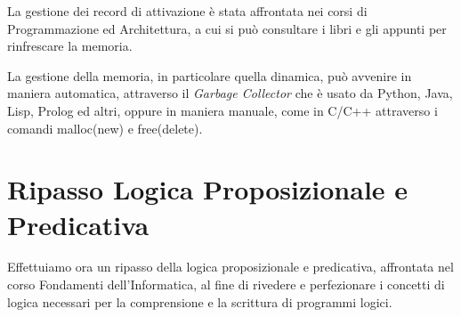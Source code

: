 \documentclass[a4paper]{report}
\begin{document}
La gestione dei record di attivazione è stata affrontata nei corsi di Programmazione ed Architettura, a cui si può consultare i
libri e gli appunti per rinfrescare la memoria.

La gestione della memoria, in particolare quella dinamica, può avvenire in maniera automatica, attraverso il \emph{Garbage Collector} che è
usato da Python, Java, Lisp, Prolog ed altri, oppure in maniera manuale, come in C/C++ attraverso i comandi malloc(new) e free(delete).

\chapter{Ripasso Logica Proposizionale e Predicativa}
Effettuiamo ora un ripasso della logica proposizionale e predicativa, affrontata nel corso Fondamenti dell'Informatica, al fine di rivedere
e perfezionare i concetti di logica necessari per la comprensione e la scrittura di programmi logici.
\end{document}
